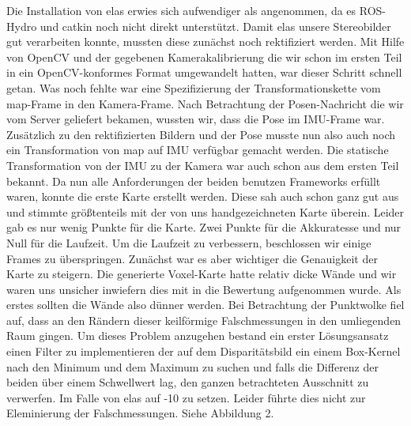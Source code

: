 \documentclass[12pt,titlepage, a4paper]{article}
\begin{document}
Die Installation von elas erwies sich aufwendiger als angenommen, da es ROS-Hydro und catkin noch nicht direkt unterstützt. Damit elas unsere Stereobilder gut verarbeiten konnte, mussten diese zunächst noch rektifiziert werden. Mit Hilfe von OpenCV und der gegebenen Kamerakalibrierung die wir schon im ersten Teil in ein OpenCV-konformes Format umgewandelt hatten, war dieser Schritt schnell getan. Was noch fehlte war eine Spezifizierung der Transformationskette vom map-Frame in den Kamera-Frame. Nach Betrachtung der Posen-Nachricht die wir vom Server geliefert bekamen, wussten wir, dass die Pose im IMU-Frame war. Zusätzlich zu den rektifizierten Bildern und der Pose musste nun also auch noch ein Transformation von map auf IMU verfügbar gemacht werden. Die statische Transformation von der IMU zu der Kamera war auch schon aus dem ersten Teil bekannt. Da nun alle Anforderungen der beiden benutzen Frameworks erfüllt waren, konnte die erste Karte erstellt werden. Diese sah auch schon ganz gut aus und stimmte größtenteils mit der von uns handgezeichneten Karte überein. Leider gab es nur wenig Punkte für die Karte. Zwei Punkte für die Akkuratesse und nur Null für die Laufzeit. Um die Laufzeit zu verbessern, beschlossen wir einige Frames zu überspringen. Zunächst war es aber wichtiger die Genauigkeit der Karte zu steigern. Die generierte Voxel-Karte hatte relativ dicke Wände und wir waren uns unsicher inwiefern dies mit in die Bewertung aufgenommen wurde. Als erstes sollten die Wände also dünner werden. Bei Betrachtung der Punktwolke fiel auf, dass an den Rändern dieser keilförmige Falschmessungen in den umliegenden Raum gingen. Um dieses Problem anzugehen bestand ein erster Lösungsansatz einen Filter zu implementieren der auf dem Disparitätsbild ein einem Box-Kernel nach den Minimum und dem Maximum zu suchen und falls die Differenz der beiden über einem Schwellwert lag, den ganzen betrachteten Ausschnitt zu verwerfen. Im Falle von elas auf -10 zu setzen. Leider führte dies nicht zur Eleminierung der Falschmessungen. Siehe Abbildung 2.
\end{document}
